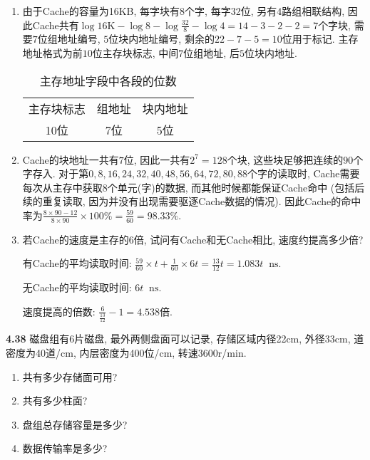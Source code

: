 \documentclass[UTF8]{report}
\newcommand{\mrm}[1]{\mathrm{#1}}
\newcommand*{\unit}[1]{\mathop{}\!\mathrm{#1}}
\newcommand{\problem}[1]{{\setlength{\parskip}{10pt}\noindent \bf{#1}}}
\newenvironment{solution}{{\noindent\hskip 2em \bf 解 \quad}}{}
\begin{document}
\begin{solution}
    \begin{enumerate}[label=(\arabic*)]
        \item 由于Cache的容量为16KB, 每字块有8个字, 每字32位, 另有$4$路组相联结构, 因此Cache共有$\log 16\mrm{K} - \log 8 - \log \frac{32}{8} - \log{4} = 14-3-2-2 = 7$个字块, 需要$7$位组地址编号, $5$位块内地址编号, 剩余的$22-7-5=10$位用于标记. 主存地址格式为前$10$位主存块标志, 中间$7$位组地址, 后$5$位块内地址.

        \begin{table}[htbp]
            \centering
            \caption{主存地址字段中各段的位数}
            \begin{tabular}{|c|c|c|}
                \hline
                主存块标志 & 组地址 & 块内地址 \bigstrut[t]\\
                10位 & 7位 & 5位 \bigstrut[b]\\
                \hline
            \end{tabular}%
        \end{table}%

        \item Cache的块地址一共有$7$位, 因此一共有$2^7 = 128$个块, 这些块足够把连续的$90$个字存入. 对于第$0, 8, 16, 24, 32, 40, 48, 56, 64, 72, 80, 88$个字的读取时, Cache需要每次从主存中获取$8$个单元(字)的数据, 而其他时候都能保证Cache命中 (包括后续的重复读取, 因为并没有出现需要驱逐Cache数据的情况). 因此Cache的命中率为$\frac{8 \times 90-12}{8 \times 90} \times 100\% = \frac{59}{60} = 98.33\%$.
        
        \item 若Cache的速度是主存的6倍, 试问有Cache和无Cache相比, 速度约提高多少倍?
        
        有Cache的平均读取时间: $\frac{59}{60} \times t + \frac{1}{60} \times 6t = \frac{13}{12} t = 1.083 t \unit{ns}$.

        无Cache的平均读取时间: $6t \unit{ns}$.

        速度提高的倍数: $\frac{6}{\frac{13}{12}} - 1 = 4.538$倍.
    \end{enumerate}
\end{solution}


\problem{4.38} 磁盘组有6片磁盘, 最外两侧盘面可以记录, 存储区域内径22cm, 外径33cm, 道密度为40道/cm, 内层密度为400位/cm, 转速3600r/min.
\begin{enumerate}[label=(\arabic*)]
    \item 共有多少存储面可用?
    \item 共有多少柱面?
    \item 盘组总存储容量是多少?
    \item 数据传输率是多少?
\end{enumerate}
\end{document}
